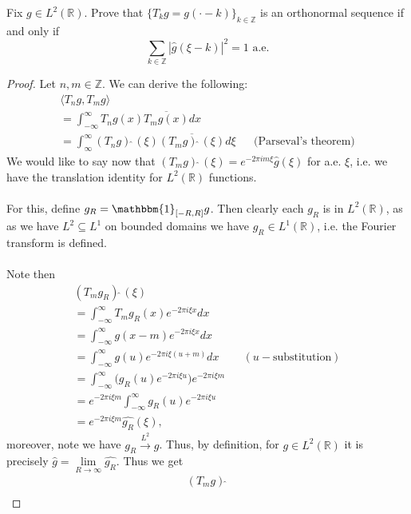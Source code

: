 \documentclass[12pt]{article}
\newenvironment{ex}[2][Exercise]{\begin{trivlist}
\item[\hskip \labelsep {\bfseries #1}\hskip \labelsep {\bfseries #2.}]}{\end{trivlist}}
\begin{document}
\begin{ex}{12}
    Fix $g \in L^2(\mathbb{R})$. Prove that $\{T_kg = g(\cdot - k)\}_{k \in \mathbb{Z}}$ is an orthonormal sequence if and only if 
    $$\sum_{k \in \mathbb{Z}} |\hat{g}(\xi - k)|^2 = 1 \text{ a.e.}$$
    \begin{proof}
        Let $n, m \in \mathbb{Z}$. We can derive the following:
        \begin{align*}
            \langle T_ng, T_mg \rangle \\
            = \int_{-\infty}^\infty T_ng(x)\overline{T_mg(x)}dx \\
            = \int_{\infty}^\infty (T_ng)\hat{\;}(\xi)\overline{(T_mg)\hat{\;}(\xi)} d\xi && \text{(Parseval's theorem)}
        \end{align*}
        We would like to say now that $(T_mg)\hat{\;}(\xi) = e^{-2\pi i m \xi}\hat{g}(\xi)$ for a.e. $\xi$, i.e. we have the translation identity for $L^2(\mathbb{R})$ functions. 
        \\ \\ For this, define $g_R = \mathbbm{1}_{[-R, R]}g$. Then clearly each $g_R$ is in $L^2(\mathbb{R})$, as as we have $L^2 \subseteq L^1$ on bounded domains we have $g_R \in L^1(\mathbb{R})$, i.e. the Fourier transform is defined. \\ \\
        Note then 
        \begin{align*}
            (T_m g_R)\hat{\;}(\xi) \\
            = \int_{-\infty}^\infty T_mg_R(x)e^{-2\pi i \xi x}dx \\ 
            = \int_{-\infty}^\infty g(x- m)e^{-2\pi i \xi x}dx \\ 
            = \int_{-\infty}^\infty g(u)e^{-2\pi i \xi (u + m)}dx && (u-\text{substitution}) \\
            = \int_{-\infty}^\infty \Big ( g_R(u)e^{-2\pi i \xi u} \Big)e^{-2\pi i \xi m} \\
            = e^{-2\pi i \xi m} \int_{-\infty}^\infty g_R(u)e^{-2\pi i \xi u} \\ 
            = e^{-2\pi i \xi m} \hat{g_R}(\xi),
        \end{align*}
        moreover, note we have $g_R \xrightarrow{L^2} g$. Thus, by definition, for $g \in L^2(\mathbb{R})$ it is precisely $\hat{g} = \underset{R \rightarrow \infty}{\lim} \hat{g_R}$. Thus we get 
        \begin{align*}
            (T_m g)\hat{\;} \\

\end{align*}
\end{proof}
\end{ex}
\end{document}
